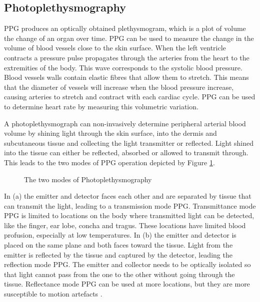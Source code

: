 \subsection{Photoplethysmography}
PPG produces an optically obtained plethysmogram, which is a plot of volume the change of an organ over time. PPG can be used to measure the change in the volume of blood vessels close to the skin surface. When the left ventricle contracts a pressure pulse propagates through the arteries from the heart to the extremities of the body. This wave corresponds to the systolic blood pressure. Blood vessels walls contain elastic fibres that allow them to stretch. This means that the diameter of vessels will increase when the blood pressure increase, causing arteries to stretch and contract with each cardiac cycle. PPG can be used to determine heart rate by measuring this volumetric variation.

\medskip
A photoplethysmograph can non-invasively determine peripheral arterial blood volume by shining light through the skin surface, into the dermis and subcutaneous tissue and collecting the light transmitter or reflected. Light shined into the tissue can either be reflected, absorbed or allowed to transmit through. This leads to the two modes of PPG operation depicted by Figure \ref{fig:PPGModes}.

\medskip
 
\begin{figure}[h]
\centering
\graphicspath{{figs/}}

\caption{The two modes of Photoplethysmography \citep{tamura2014wearable}}
\label{fig:PPGModes}
\end{figure}

In (a) the emitter and detector faces each other and are separated by tissue that can transmit the light, leading to a transmission mode PPG. Transmittance mode PPG is limited to locations on the body where transmitted light can be detected, like the finger, ear lobe, concha and tragus. These locations have limited blood profusion, especially at low temperatures. In (b) the emitter and detector is placed on the same plane and both faces toward the tissue. Light from the emitter is reflected by the tissue and captured by the detector, leading the reflection mode PPG. The emitter and collector needs to be optically isolated so that light cannot pass from the one to the other without going through the tissue. Reflectance mode PPG can be used at more locations, but they are more susceptible to motion artefacts \citep{tamura2014wearable}.

